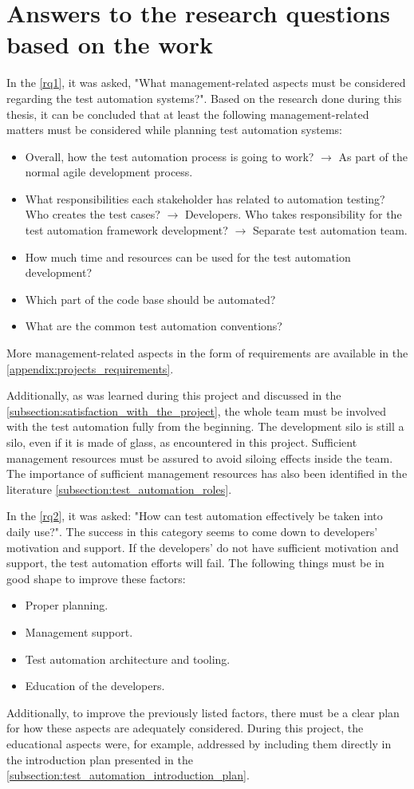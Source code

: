 \section{Answers to the research questions based on the work}
In the \autoref{rq1}, it was asked, "What management-related aspects must be considered regarding the test automation systems?". Based on the research done during this thesis, it can be concluded that at least the following management-related matters must be considered while planning test automation systems:
\begin{itemize}[noitemsep]
	\item Overall, how the test automation process is going to work? $\rightarrow$ As part of the normal agile development process.
	\item What responsibilities each stakeholder has related to automation testing? Who creates the test cases? $\rightarrow$ Developers. Who takes responsibility for the test automation framework development? $\rightarrow$ Separate test automation team.
	\item How much time and resources can be used for the test automation development?
	\item Which part of the code base should be automated?
	\item What are the common test automation conventions?
\end{itemize}
More management-related aspects in the form of requirements are available in the \autoref{appendix:projects_requirements}.

Additionally, as was learned during this project and discussed in the \autoref{subsection:satisfaction_with_the_project}, the whole team must be involved with the test automation fully from the beginning. The development silo is still a silo, even if it is made of glass, as encountered in this project. Sufficient management resources must be assured to avoid siloing effects inside the team. The importance of sufficient management resources has also been identified in the literature \autoref{subsection:test_automation_roles}.

In the \autoref{rq2}, it was asked: "How can test automation effectively be taken into daily use?". The success in this category seems to come down to developers' motivation and support. If the developers' do not have sufficient motivation and support, the test automation efforts will fail. The following things must be in good shape to improve these factors:
\begin{itemize}[noitemsep]
	\item Proper planning.
	\item Management support.
	\item Test automation architecture and tooling.
	\item Education of the developers.
\end{itemize}
Additionally, to improve the previously listed factors, there must be a clear plan for how these aspects are adequately considered. During this project, the educational aspects were, for example, addressed by including them directly in the introduction plan presented in the \autoref{subsection:test_automation_introduction_plan}.

